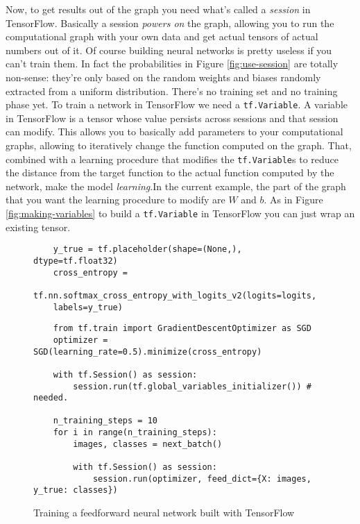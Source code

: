 Now, to get results out of the graph you need what's called a
\emph{session} in TensorFlow. Basically a session \emph{powers on} the
graph, allowing you to run the computational graph with your own data
and get actual tensors of actual numbers out of it. Of course building
neural networks is pretty useless if you can't train them. In fact the
probabilities in Figure \ref{fig:use-session} are totally non-sense:
they're only based on the random weights and biases randomly extracted
from a uniform distribution. There's no training set and no training
phase yet. To train a network in TensorFlow we need a
\texttt{tf.Variable}. A variable in TensorFlow is a tensor whose value
persists across sessions and that session can modify. This allows you
to basically add parameters to your computational graphs, allowing to
iteratively change the function computed on the graph. That, combined
with a learning procedure that modifies the \texttt{tf.Variable}s to
reduce the distance from the target function to the actual function
computed by the network, make the model \emph{learning}.In the current
example, the part of the graph that you want the learning procedure to
modify are $W$ and $b$. As in Figure \ref{fig:making-variables} to
build a \texttt{tf.Variable} in TensorFlow you can just wrap an
existing tensor.

\begin{figure}
  \begin{verbatim}
    y_true = tf.placeholder(shape=(None,), dtype=tf.float32)
    cross_entropy =
    tf.nn.softmax_cross_entropy_with_logits_v2(logits=logits,
    labels=y_true)
  \end{verbatim}
  \caption{}
  \label{fig:cross-entropy}
\end{figure}

\begin{figure}
  \begin{verbatim}
    from tf.train import GradientDescentOptimizer as SGD
    optimizer = SGD(learning_rate=0.5).minimize(cross_entropy)

    with tf.Session() as session:
        session.run(tf.global_variables_initializer()) # needed.

    n_training_steps = 10
    for i in range(n_training_steps):
        images, classes = next_batch()

        with tf.Session() as session:
            session.run(optimizer, feed_dict={X: images, y_true: classes})
  \end{verbatim}
  \caption{Training a feedforward neural network built with TensorFlow}
  \label{fig:training-network}
\end{figure}

